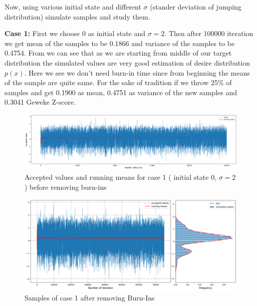\begin{example}
    Now, using various initial state and different $ \sigma $ (stander deviation of jumping distribution) simulate samples and study them. 

    \textbf{Case 1:} First we choose $ 0 $ as initial state and $ \sigma = 2 $. Then after 100000 iteration we get mean of the samples to be 0.1866 and variance of the samples to be 0.4754. 
        From  we can see that as we are starting from middle of our target distribution the simulated values are very good estimation of desire distribution $ p(x) $. Here we see we don't need burn-in time since from beginning the means of the sample are quite same. For the sake of tradition if we throw 25\% of samples and get 0.1900 as mean, 0.4751 as variance of the new samples and 0.3041 Geweke Z-score. 

    \begin{figure}[H]
        \centering
        \includegraphics[width=1\textwidth]{./images/metropolis/example1/sample-1-values.png}
        \caption{Accepted values and running means for case 1 ( initial state 0, $ \sigma = 2 $ ) before removing burn-ins}
        \label{fig:MH sample 1 values}
    \end{figure}

    \begin{figure}[H]
        \centering
        \includegraphics[width=1\textwidth]{./images/metropolis/example1/sample-1-value-hist-bo.png}
        \caption{Samples of case 1 after removing Burn-Ins}
        \label{fig:MH sample 1 after burn-in}
    \end{figure}


\end{example}
